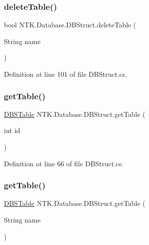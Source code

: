 \subsubsection{\texorpdfstring{deleteTable()}{deleteTable()}\hspace{0.1cm}{\footnotesize\ttfamily [2/2]}}
{\footnotesize\ttfamily bool N\+T\+K.\+Database.\+D\+B\+Struct.\+delete\+Table (\begin{DoxyParamCaption}\item[{String}]{name }\end{DoxyParamCaption})}



Definition at line 101 of file D\+B\+Struct.\+cs.

\mbox{\label{class_n_t_k_1_1_database_1_1_d_b_struct_a682f9e3a52a28461d2949f4395e06eae}} 
\subsubsection{\texorpdfstring{getTable()}{getTable()}\hspace{0.1cm}{\footnotesize\ttfamily [1/2]}}
{\footnotesize\ttfamily \mbox{\hyperlink{class_n_t_k_1_1_database_1_1_d_b_s_table}{D\+B\+S\+Table}} N\+T\+K.\+Database.\+D\+B\+Struct.\+get\+Table (\begin{DoxyParamCaption}\item[{int}]{id }\end{DoxyParamCaption})}



Definition at line 66 of file D\+B\+Struct.\+cs.

\mbox{\label{class_n_t_k_1_1_database_1_1_d_b_struct_ae2b27af45753c3c042a7b35b821c348c}} 
\subsubsection{\texorpdfstring{getTable()}{getTable()}\hspace{0.1cm}{\footnotesize\ttfamily [2/2]}}
{\footnotesize\ttfamily \mbox{\hyperlink{class_n_t_k_1_1_database_1_1_d_b_s_table}{D\+B\+S\+Table}} N\+T\+K.\+Database.\+D\+B\+Struct.\+get\+Table (\begin{DoxyParamCaption}\item[{String}]{name }\end{DoxyParamCaption})}



